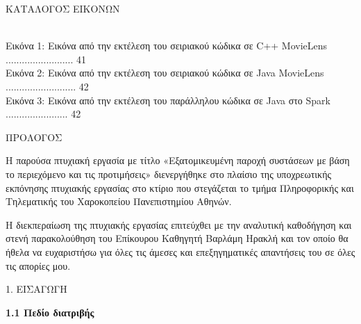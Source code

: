 \documentclass{report}
\begin{document}
 \vspace{25mm}
 
\begin{center}
\huge{ΚΑΤΑΛΟΓΟΣ ΕΙΚΟΝΩΝ}
\end{center}
\\
Εικόνα 1: Εικόνα από την εκτέλεση του σειριακού κώδικα σε \textlatin{C++ MovieLens} .........................  41
\\
Εικόνα 2: Εικόνα από την εκτέλεση του σειριακού κώδικα σε \textlatin{Java MovieLens} .......................... 42
\\
Εικόνα 3: Εικόνα από την εκτέλεση του παράλληλου κώδικα σε \textlatin{Java} στο \textlatin{Spark} ....................... 42
\newpage

\begin{center}
\LARGE{ΠΡΟΛΟΓΟΣ}
\end{center}

\vspace{10mm}

\par{ Η παρούσα πτυχιακή εργασία με τίτλο «Εξατομικευμένη παροχή συστάσεων με βάση το περιεχόμενο και τις προτιμήσεις» διενεργήθηκε στο πλαίσιο της υποχρεωτικής εκπόνησης πτυχιακής εργασίας στο κτίριο που στεγάζεται το τμήμα Πληροφορικής και Τηλεματικής του Χαροκοπείου Πανεπιστημίου Αθηνών.
}

\par { Η διεκπεραίωση της πτυχιακής εργασίας  επιτεύχθει με την αναλυτική καθοδήγηση και στενή παρακολούθηση του Επίκουρου Καθηγητή Βαρλάμη Ηρακλή και τον οποίο θα ήθελα να ευχαριστήσω για όλες τις άμεσες και επεξηγηματικές απαντήσεις του σε όλες τις απορίες μου.
}

\newpage


\begin{center}

\LARGE{1. ΕΙΣΑΓΩΓΗ}

\end{center}

\vspace{2mm} 

\textbf{\large{1.1 Πεδίο διατριβής}}

\vspace{2mm}
\end{document}
